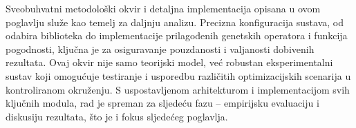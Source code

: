 Sveobuhvatni metodološki okvir i detaljna implementacija opisana u ovom poglavlju služe kao temelj za daljnju analizu. Precizna konfiguracija sustava, od odabira biblioteka do implementacije prilagođenih genetskih operatora i funkcija pogodnosti, ključna je za osiguravanje pouzdanosti i valjanosti dobivenih rezultata. Ovaj okvir nije samo teorijski model, već robustan eksperimentalni sustav koji omogućuje testiranje i usporedbu različitih optimizacijskih scenarija u kontroliranom okruženju. S uspostavljenom arhitekturom i implementacijom svih ključnih modula, rad je spreman za sljedeću fazu – empirijsku evaluaciju i diskusiju rezultata, što je i fokus sljedećeg poglavlja.
